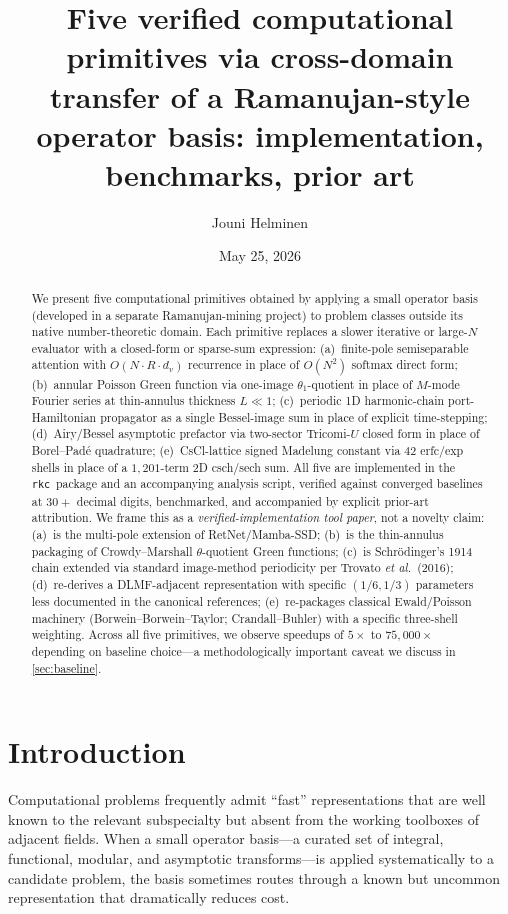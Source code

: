 \documentclass[11pt,reqno]{amsart}
\title{Five verified computational primitives via cross-domain transfer
of a Ramanujan-style operator basis: implementation, benchmarks, prior art}
\author{Jouni Helminen}
\date{May 25, 2026}
\theoremstyle{definition}
\newcommand{\rkc}{\texttt{rkc}}
\begin{document}
\begin{abstract}
We present five computational primitives obtained by applying a small
operator basis (developed in a separate Ramanujan-mining project) to
problem classes outside its native number-theoretic domain. Each
primitive replaces a slower iterative or large-$N$ evaluator with a
closed-form or sparse-sum expression: (a)~finite-pole semiseparable
attention with $O(N \cdot R \cdot d_v)$ recurrence in place of $O(N^2)$
softmax direct form; (b)~annular Poisson Green function via one-image
$\theta_1$-quotient in place of $M$-mode Fourier series at thin-annulus
thickness $L \ll 1$; (c)~periodic 1D harmonic-chain port-Hamiltonian
propagator as a single Bessel-image sum in place of explicit
time-stepping; (d)~Airy/Bessel asymptotic prefactor via two-sector
Tricomi-$U$ closed form in place of Borel--Pad\'e quadrature;
(e)~CsCl-lattice signed Madelung constant via $42$ erfc/exp shells in
place of a $1{,}201$-term 2D csch/sech sum. All five are implemented in
the \rkc\ package and an accompanying analysis script, verified against
converged baselines at $30+$ decimal digits, benchmarked, and
accompanied by explicit prior-art attribution. We frame this as a
\emph{verified-implementation tool paper}, not a novelty claim:
(a)~is the multi-pole extension of RetNet/Mamba-SSD; (b)~is the
thin-annulus packaging of Crowdy--Marshall $\theta$-quotient Green
functions; (c)~is Schr\"odinger's 1914 chain extended via standard
image-method periodicity per Trovato \emph{et al.}~(2016); (d)~re-derives
a DLMF-adjacent representation with specific $(1/6, 1/3)$ parameters
less documented in the canonical references; (e)~re-packages classical
Ewald/Poisson machinery (Borwein--Borwein--Taylor; Crandall--Buhler)
with a specific three-shell weighting. Across all five primitives, we
observe speedups of $5\times$ to $75{,}000\times$ depending on baseline
choice---a methodologically important caveat we discuss in
\cref{sec:baseline}.
\end{abstract}

\maketitle

\section{Introduction}\label{sec:intro}

Computational problems frequently admit ``fast'' representations that
are well known to the relevant subspecialty but absent from the working
toolboxes of adjacent fields. When a small operator basis---a curated
set of integral, functional, modular, and asymptotic transforms---is
applied systematically to a candidate problem, the basis sometimes
routes through a known but uncommon representation that dramatically
reduces cost.
\end{document}
